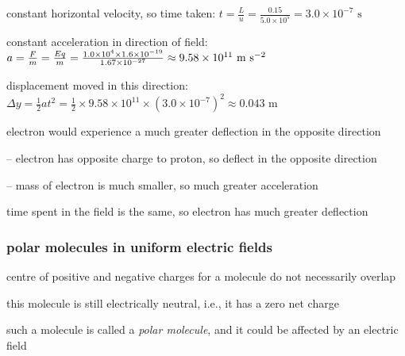 
\sol constant horizontal velocity, so time taken: $t = \frac{L}{u} = \frac{0.15}{5.0\times10^5} = 3.0\times10^{-7} \text{ s}$

\eqyskip constant acceleration in direction of field: $
a = \frac{F}{m} = \frac{Eq}{m} = \frac{1.0\times10^4\times1.6\times10^{-19}}{1.67\times10^{-27}} \approx 9.58\times10^{11}\text{ m s$^{-2}$} $

\eqyskip displacement moved in this direction: $
\Delta y=\frac{1}{2}at^2 = \frac{1}{2} \times 9.58\times10^{11} \times (3.0\times10^{-7})^2 \approx 0.043 \text{ m} $

electron would experience a much greater deflection in the opposite direction

\begin{compactenum}
	\item[--] electron has opposite charge to proton, so deflect in the opposite direction
	
	\item[--] mass of electron is much smaller, so much greater acceleration
	
	time spent in the field is the same, so electron has much greater deflection \eoe
\end{compactenum}




\subsubsection{polar molecules in uniform electric fields}

centre of positive and negative charges for a molecule do not necessarily overlap

this molecule is still electrically neutral, i.e., it has a zero net charge

such a molecule is called a \emph{polar molecule}, and it could be affected by an electric field 


